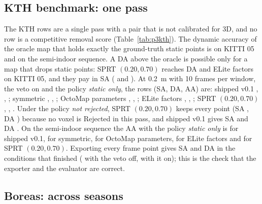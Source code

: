 \subsection{KTH benchmark: one pass}\label{subsec:p3kth}



The KTH rows are a single pass with a pair that is not calibrated for 3D, and no row is a competitive removal score (Table~\ref{tab:p3kth}). The dynamic accuracy of the oracle map that holds exactly the ground-truth static points is \PtKthCeil{} on KITTI 05 and \PtKthCeilSemi{} on the semi-indoor sequence. A DA above the oracle is possible only for a map that drops static points: SPRT $(0.20,0.70)$ reaches DA \PtKthDASprt{} and ELite factors \PtKthDAElite{} on KITTI 05, and they pay in SA (\PtKthSASprt{} and \PtKthSAElite{}). At 0.2~m with 10 frames per window, the veto on and the policy \emph{static only}, the rows (SA, DA, AA) are: shipped v0.1 \PtKthSAShipped, \PtKthDAShipped, \PtKthAAShipped; symmetric \PtKthSASymm, \PtKthDASymm, \PtKthAASymm; OctoMap parameters \PtKthSAOcto, \PtKthDAOcto, \PtKthAAOcto; ELite factors \PtKthSAElite, \PtKthDAElite, \PtKthAAElite; SPRT $(0.20,0.70)$ \PtKthSASprt, \PtKthDASprt, \PtKthAASprt. Under the policy \emph{not rejected}, SPRT $(0.20,0.70)$ keeps every point (SA \PtKthNrSASprt, DA \PtKthNrDASprt) because no voxel is Rejected in this pass, and shipped v0.1 gives SA \PtKthNrSAShipped{} and DA \PtKthNrDAShipped. On the semi-indoor sequence the AA with the policy \emph{static only} is \PtSemiAAShipped{} for shipped v0.1, \PtSemiAASymm{} for symmetric, \PtSemiAAOcto{} for OctoMap parameters, \PtSemiAAElite{} for ELite factors and \PtSemiAASprt{} for SPRT $(0.20,0.70)$. Exporting every frame point gives SA \PtKthIdSA{} and DA \PtKthIdDA{} in the \PtKthIdCount{} conditions that finished (\PtKthIdOff{} with the veto off, \PtKthIdOn{} with it on); this is the check that the exporter and the evaluator are correct.

\subsection{Boreas: across seasons}\label{subsec:p3boreas}


